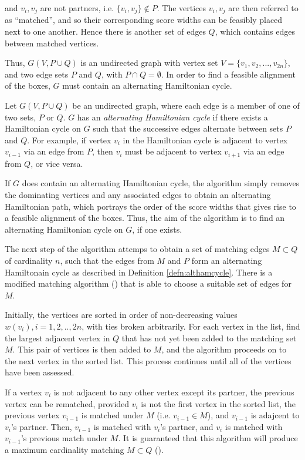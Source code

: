 \documentclass[oribibl]{llncs}
\begin{document}
and $v_i, v_j$ are not partners, i.e. $\{v_i, v_j\} \notin P$. The vertices $v_i, v_j$ are then referred to as ``matched'', and so their corresponding score widths can be feasibly placed next to one another. Hence there is another set of edges $Q$, which contains edges between matched vertices. 

Thus, $G(V, P\cup Q)$ is an undirected graph with vertex set $V = \{v_1, v_2, ..., v_{2n}\}$, and two edge sets $P$ and $Q$, with $P \cap Q = \emptyset$. In order to find a feasible alignment of the boxes, $G$ must contain an alternating Hamiltonian cycle.

\begin{definition}
	\label{defn:althamcycle}
	Let $G(V, P\cup Q)$ be an undirected graph, where each edge is a member of one of two sets, $P$ or $Q$. $G$ has an \textit{alternating Hamiltonian cycle} if there exists a Hamiltonian cycle on $G$ such that the successive edges alternate between sets $P$ and $Q$. For example, if vertex $v_i$ in the Hamiltonian cycle is adjacent to vertex $v_{i-1}$ via an edge from $P$, then $v_i$ must be adjacent to vertex $v_{i+1}$ via an edge from $Q$, or vice versa. 
\end{definition}

If $G$ does contain an alternating Hamiltonian cycle, the algorithm simply removes the dominating vertices and any associated edges to obtain an alternating Hamiltonian path, which portrays the order of the score widths that gives rise to a feasible alignment of the boxes. Thus, the aim of the algorithm is to find an alternating Hamiltonian cycle on $G$, if one exists.

The next step of the algorithm attemps to obtain a set of matching edges $M \subset Q$ of cardinality $n$, such that the edges from $M$ and $P$ form an alternating Hamiltonain cycle as described in Definition \ref{defn:althamcycle}. There is a modified matching algorithm (\citealp{mahadev1994, becker2010}) that is able to choose a suitable set of edges for $M$.

Initially, the vertices are sorted in order of non-decreasing values $w(v_i), i = 1,2, .., 2n$, with ties broken arbitrarily. For each vertex in the list, find the largest adjacent vertex in $Q$ that has not yet been added to the matching set $M$. This pair of vertices is then added to $M$, and the algorithm proceeds on to the next vertex in the sorted list. This process continues until all of the vertices have been assessed. 

If a vertex $v_i$ is not adjacent to any other vertex except its partner, the previous vertex can be rematched, provided $v_i$ is not the first vertex in the sorted list, the previous vertex $v_{i-1}$ is matched under $M$ (i.e. $v_{i-1} \in M$), and $v_{i-1}$ is adajcent to $v_i$'s partner. Then, $v_{i-1}$ is matched with $v_i$'s partner, and $v_i$ is matched with $v_{i-1}$'s previous match under $M$. It is guaranteed that this algorithm will produce a maximum cardinality matching $M \subset Q$ (\citealp{becker2010}).
\end{document}
